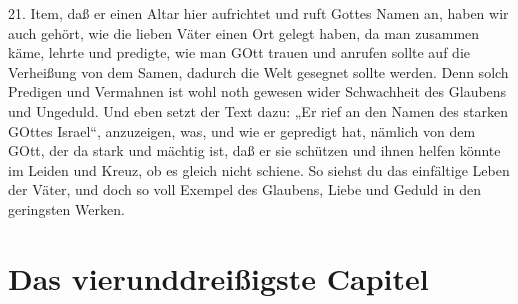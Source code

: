 21. Item, daß er einen Altar hier aufrichtet und ruft Gottes Namen an, haben wir auch gehört, wie die lieben Väter einen Ort gelegt haben, da man zusammen käme, lehrte und predigte, wie man GOtt trauen und anrufen sollte auf die Verheißung von dem Samen, dadurch die Welt gesegnet sollte werden. Denn solch Predigen und Vermahnen ist wohl noth gewesen wider Schwachheit des Glaubens und Ungeduld. Und eben setzt der Text dazu: „Er rief an den Namen des starken GOttes Israel“, anzuzeigen, was, und wie er gepredigt hat, nämlich von dem GOtt, der da stark und mächtig ist, daß er sie schützen und ihnen helfen könnte im Leiden und Kreuz, ob es gleich nicht schiene. So siehst du das einfältige Leben der Väter, und doch so voll Exempel des Glaubens, Liebe und Geduld in den geringsten Werken.

\section{Das vierunddreißigste Capitel}
